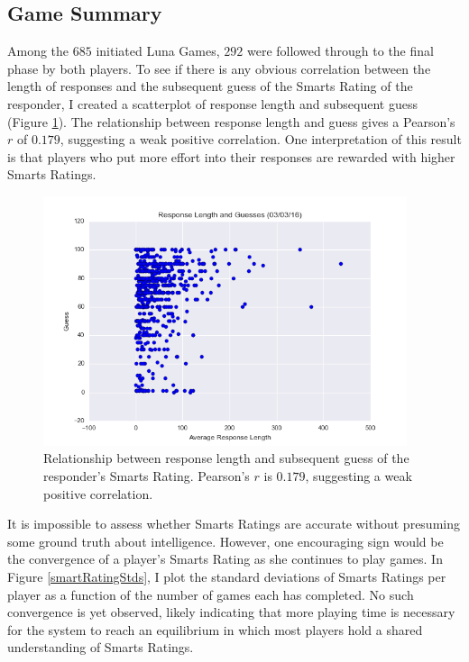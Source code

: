\subsection{Game Summary}

Among the $685$ initiated Luna Games, $292$ were followed through to the final phase by both players. To see if there is any obvious correlation between the length of responses and the subsequent guess of the Smarts Rating of the responder, I created a scatterplot of response length and subsequent guess (Figure \ref{responseLengthGuess}). The relationship between response length and guess gives a Pearson's $r$ of $0.179$, suggesting a weak positive correlation. One interpretation of this result is that players who put more effort into their responses are rewarded with higher Smarts Ratings.

\begin{figure}
\includegraphics[width=0.95\textwidth]{figures/responseVsGuesses.png}
\caption{\label{responseLengthGuess} Relationship between response length and subsequent guess of the responder's Smarts Rating. Pearson's $r$ is $0.179$, suggesting a weak positive correlation.}
\end{figure}

It is impossible to assess whether Smarts Ratings are accurate without presuming some ground truth about intelligence. However, one encouraging sign would be the convergence of a player's Smarts Rating as she continues to play games. In Figure \ref{smartRatingStds}, I plot the standard deviations of Smarts Ratings per player as a function of the number of games each has completed. No such convergence is yet observed, likely indicating that more playing time is necessary for the system to reach an equilibrium in which most players hold a shared understanding of Smarts Ratings. 

